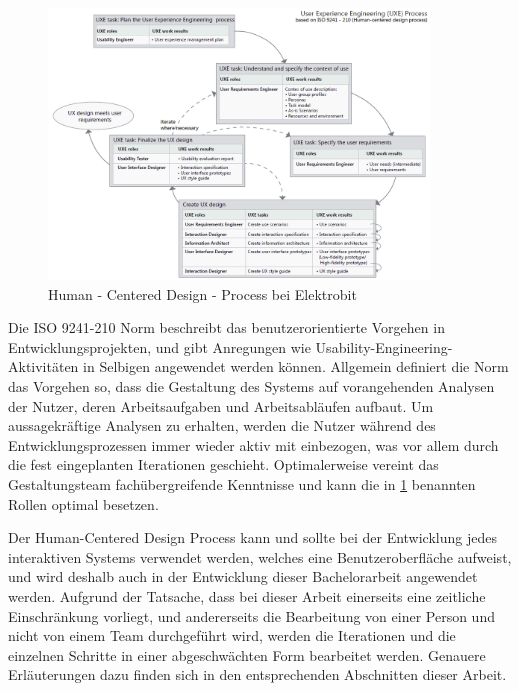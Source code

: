 \begin{figure}
\begin{center}
  \includegraphics[width=0.9\textwidth]{figures/HCD.png}
  \caption{Human - Centered Design - Process bei Elektrobit}
  \label{fig:HCD}
\end{center}
\end{figure}

Die ISO 9241-210 Norm beschreibt das benutzerorientierte Vorgehen in Entwicklungsprojekten, und gibt Anregungen wie Usability-Engineering-Aktivitäten in Selbigen angewendet werden können.
Allgemein definiert die Norm das Vorgehen so, dass die Gestaltung des Systems auf vorangehenden Analysen der Nutzer, deren Arbeitsaufgaben und Arbeitsabläufen aufbaut.
Um aussagekräftige Analysen zu erhalten, werden die Nutzer während des Entwicklungsprozessen immer wieder aktiv mit einbezogen, was vor allem durch die fest eingeplanten Iterationen geschieht.
Optimalerweise vereint das Gestaltungsteam fachübergreifende Kenntnisse und kann die in \cref{fig:HCD} benannten Rollen optimal besetzen\cite{.d}.

Der Human-Centered Design Process kann und sollte bei der Entwicklung jedes interaktiven Systems verwendet werden, welches eine Benutzeroberfläche aufweist, und wird deshalb auch in der Entwicklung dieser Bachelorarbeit angewendet werden.
Aufgrund der Tatsache, dass bei dieser Arbeit einerseits eine zeitliche Einschränkung vorliegt, und andererseits die Bearbeitung von einer Person und nicht von einem Team durchgeführt wird, werden die Iterationen und die einzelnen Schritte in einer abgeschwächten Form bearbeitet werden. Genauere Erläuterungen dazu finden sich in den entsprechenden Abschnitten dieser Arbeit.

